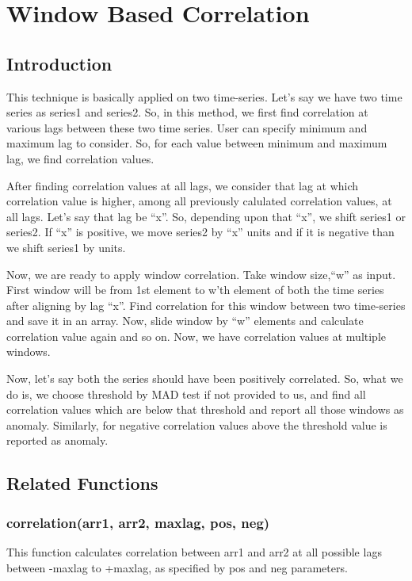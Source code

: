 \chapter{Window Based Correlation}

\section{Introduction}

This technique is basically applied on two time-series. Let's say we have two 
time series as series1 and series2. So, in this method, we first find 
correlation at various lags between these two time series. User can specify 
minimum and maximum lag to consider. So, for each value between minimum and maximum lag, we find correlation values.

After finding correlation values at all lags, we consider that lag at which 
correlation value is higher, among all previously calulated correlation values, 
at all lags. Let's say that lag be ``x''. So, depending upon that ``x'', we 
shift series1 or series2. If ``x'' is positive, we move series2 by ``x'' units 
and if it is negative than we shift series1 by  units.

Now, we are ready to apply window correlation. Take window size,``w'' as 
input. First window will be from 1st element to w'th element of both the time 
series after aligning by lag ``x''. Find correlation for this window between 
two time-series and save it in an array. Now, slide window by ``w'' elements 
and 
calculate correlation value again and so on. Now, we have correlation values at 
multiple windows.

Now, let's say both the series should have been positively correlated. So, what 
we do is, we choose threshold by MAD test if not provided to us, and find all 
correlation values which are below that threshold and report all those windows 
as anomaly. Similarly, for negative correlation values above the threshold value is reported as anomaly.

\section{Related Functions}

\subsection{correlation(arr1, arr2, maxlag, pos, neg)}

This function calculates correlation between arr1 and arr2 at all possible lags 
between -maxlag to +maxlag, as specified by pos and neg parameters.

